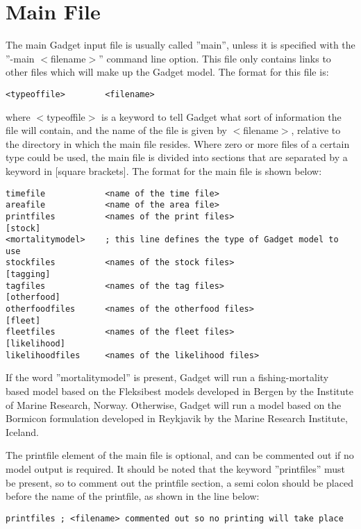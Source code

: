 \documentclass [a4paper, 10pt]{book}
\begin{document}
\section{Main File}\label{sec:mainfile}
The main Gadget input file is usually called ''main'', unless it is specified with the ''-main $<$filename$>$'' command line option.  This file only contains links to other files which will make up the Gadget model.  The format for this file is:

{\small\begin{verbatim}
<typeoffile>        <filename>
\end{verbatim}}

where $<$typeoffile$>$ is a keyword to tell Gadget what sort of information the file will contain, and the name of the file is given by $<$filename$>$, relative to the directory in which the main file resides.  Where zero or more files of a certain type could be used, the main file is divided into sections that are separated by a keyword in [square brackets].  The format for the main file is shown below:

{\small\begin{verbatim}
timefile            <name of the time file>
areafile            <name of the area file>
printfiles          <names of the print files>
[stock]
<mortalitymodel>    ; this line defines the type of Gadget model to use
stockfiles          <names of the stock files>
[tagging]
tagfiles            <names of the tag files>
[otherfood]
otherfoodfiles      <names of the otherfood files>
[fleet]
fleetfiles          <names of the fleet files>
[likelihood]
likelihoodfiles     <names of the likelihood files>
\end{verbatim}}

If the word ''mortalitymodel'' is present, Gadget will run a fishing-mortality based model based on the Fleksibest models developed in Bergen by the Institute of Marine Research, Norway.  Otherwise, Gadget will run a model based on the Bormicon formulation developed in Reykjavik by the Marine Research Institute, Iceland.

\bigskip
The printfile element of the main file is optional, and can be commented out if no model output is required.  It should be noted that the keyword ''printfiles'' must be present, so to comment out the printfile section, a semi colon should be placed before the name of the printfile, as shown in the line below:

{\small\begin{verbatim}
printfiles ; <filename> commented out so no printing will take place
\end{verbatim}}
\end{document}
